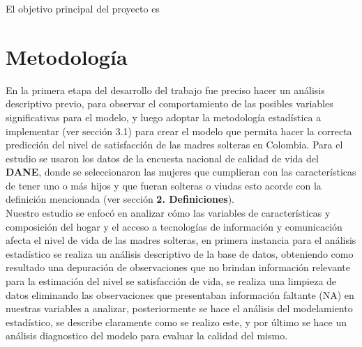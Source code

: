\documentclass[11pt,twoside]{article}
\begin{document}


El objetivo principal del proyecto es 





\section{Metodología}
\noindent
En la primera etapa del desarrollo del trabajo fue preciso hacer un análisis descriptivo previo, para observar el comportamiento de las posibles variables significativas para el modelo, y luego adoptar la metodología estadística a implementar (ver sección 3.1) para crear el modelo que permita hacer la correcta predicción del nivel de satisfacción de las madres solteras en Colombia. Para el estudio se usaron los datos de la encuesta nacional de calidad de vida del \textbf{DANE}, donde se seleccionaron las mujeres que cumplieran con las características de tener uno o más hijos y que fueran solteras o viudas esto acorde con la definición mencionada (ver sección \textbf{2. Definiciones}).
\\
Nuestro estudio se enfocó en analizar cómo las variables de características y composición del hogar y el acceso a tecnologías de información y comunicación afecta el nivel de vida de las madres solteras, en primera instancia para el análisis estadístico se realiza un análisis descriptivo de la base de datos, obteniendo como resultado una depuración de observaciones que no brindan información relevante para la estimación del nivel se satisfacción de vida, se realiza una limpieza de datos eliminando las observaciones que presentaban información faltante (NA) en nuestras variables a analizar, posteriormente se hace el análisis del modelamiento estadístico, se describe claramente como se realizo este, y por último se hace un análisis diagnostico del modelo para evaluar la calidad del mismo. 
\\
\end{document}
